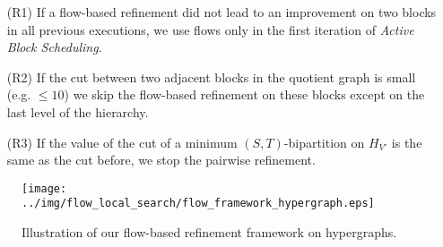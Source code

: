\begin{enumerate}
\item[(R1)] If a flow-based refinement did not lead to an improvement on two blocks in all previous
            executions, we use flows only in the first iteration of 
            \emph{Active Block Scheduling}.
\item[(R2)] If the cut between two adjacent blocks in the quotient graph is small (e.g. $\le 10$) we
            skip the flow-based refinement on these blocks except on the last level of the hierarchy.
\item[(R3)] If the value of the cut of a minimum $(S,T)$-bipartition on $H_{V'}$ is the same 
            as the cut before, we stop the pairwise refinement.
\end{enumerate}

\begin{figure}
\centering 
\texttt{[image: ../img/flow\_local\_search/flow\_framework\_hypergraph.eps]}
\caption{Illustration of our flow-based refinement framework on hypergraphs.}
\label{img:flow_framework}
\end{figure} 